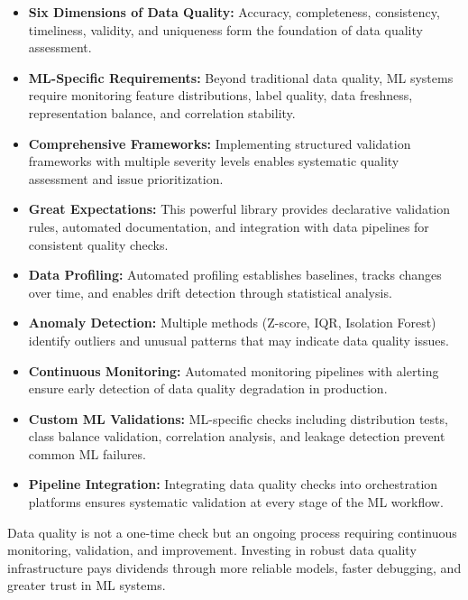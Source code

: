 \begin{itemize}
    \item \textbf{Six Dimensions of Data Quality:} Accuracy, completeness, consistency, timeliness, validity, and uniqueness form the foundation of data quality assessment.

    \item \textbf{ML-Specific Requirements:} Beyond traditional data quality, ML systems require monitoring feature distributions, label quality, data freshness, representation balance, and correlation stability.

    \item \textbf{Comprehensive Frameworks:} Implementing structured validation frameworks with multiple severity levels enables systematic quality assessment and issue prioritization.

    \item \textbf{Great Expectations:} This powerful library provides declarative validation rules, automated documentation, and integration with data pipelines for consistent quality checks.

    \item \textbf{Data Profiling:} Automated profiling establishes baselines, tracks changes over time, and enables drift detection through statistical analysis.

    \item \textbf{Anomaly Detection:} Multiple methods (Z-score, IQR, Isolation Forest) identify outliers and unusual patterns that may indicate data quality issues.

    \item \textbf{Continuous Monitoring:} Automated monitoring pipelines with alerting ensure early detection of data quality degradation in production.

    \item \textbf{Custom ML Validations:} ML-specific checks including distribution tests, class balance validation, correlation analysis, and leakage detection prevent common ML failures.

    \item \textbf{Pipeline Integration:} Integrating data quality checks into orchestration platforms ensures systematic validation at every stage of the ML workflow.
\end{itemize}

Data quality is not a one-time check but an ongoing process requiring continuous monitoring, validation, and improvement. Investing in robust data quality infrastructure pays dividends through more reliable models, faster debugging, and greater trust in ML systems.

